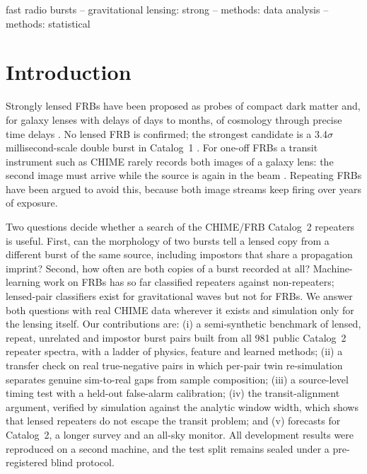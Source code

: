 \documentclass[fleqn,usenatbib]{mnras}
\begin{document}
\begin{keywords}
fast radio bursts -- gravitational lensing: strong -- methods: data analysis -- methods: statistical
\end{keywords}

\section{Introduction}
Strongly lensed FRBs have been proposed as probes of compact dark matter \citep{Kader2022,Leung2022,Krochek2022} and,
for galaxy lenses with delays of days to months, of cosmology through precise time delays \citep{Li2018,Wucknitz2021}.
No lensed FRB is confirmed; the strongest candidate is a 3.4$\sigma$ millisecond-scale double burst in Catalog~1 \citep{Chang2024}.
For one-off FRBs a transit instrument such as CHIME rarely records both images of a galaxy lens:
the second image must arrive while the source is again in the beam \citep{ConnorRavi2022}.
Repeating FRBs have been argued to avoid this, because both image streams keep firing over years of exposure.

Two questions decide whether a search of the CHIME/FRB Catalog~2 repeaters is useful.
First, can the morphology of two bursts tell a lensed copy from a different burst of the same source,
including impostors that share a propagation imprint?
Second, how often are both copies of a burst recorded at all?
Machine-learning work on FRBs has so far classified repeaters against non-repeaters; lensed-pair classifiers exist for
gravitational waves \citep{Goyal2021,Zhang2026} but not for FRBs.
We answer both questions with real CHIME data wherever it exists and simulation only for the lensing itself.
Our contributions are: (i) a semi-synthetic benchmark of lensed, repeat, unrelated and impostor burst pairs built from all
981 public Catalog~2 repeater spectra, with a ladder of physics, feature and learned methods; (ii) a transfer check on real
true-negative pairs in which per-pair twin re-simulation separates genuine sim-to-real gaps from sample composition;
(iii) a source-level timing test with a held-out false-alarm calibration; (iv) the transit-alignment argument, verified
by simulation against the analytic window width, which shows that lensed repeaters do not escape the transit problem;
and (v) forecasts for Catalog~2, a longer survey and an all-sky monitor. All development results were reproduced on a
second machine, and the test split remains sealed under a pre-registered blind protocol.
\end{document}

